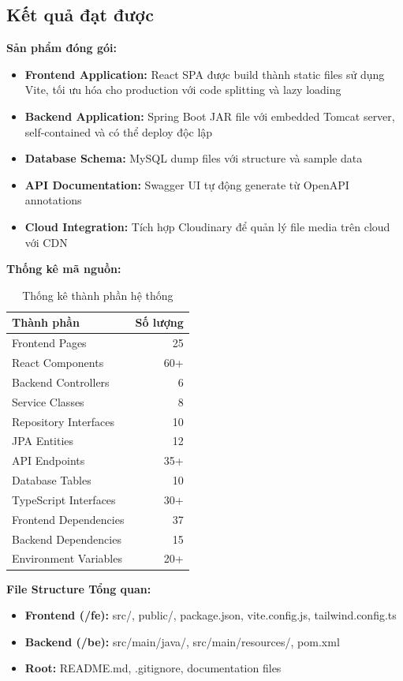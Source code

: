 \documentclass[../DoAn.tex]{subfiles}
\begin{document}
\subsection{Kết quả đạt được}

\textbf{Sản phẩm đóng gói:}
\begin{itemize}
    \item \textbf{Frontend Application:} React SPA được build thành static files sử dụng Vite, tối ưu hóa cho production với code splitting và lazy loading
    \item \textbf{Backend Application:} Spring Boot JAR file với embedded Tomcat server, self-contained và có thể deploy độc lập
    \item \textbf{Database Schema:} MySQL dump files với structure và sample data
    \item \textbf{API Documentation:} Swagger UI tự động generate từ OpenAPI annotations
    \item \textbf{Cloud Integration:} Tích hợp Cloudinary để quản lý file media trên cloud với CDN
\end{itemize}

\textbf{Thống kê mã nguồn:}
\begin{table}[H]
\centering{}
\begin{tabular}{|l|r|}
\hline
\textbf{Thành phần} & \textbf{Số lượng} \\ \hline
Frontend Pages & 25 \\ \hline
React Components & 60+ \\ \hline
Backend Controllers & 6 \\ \hline
Service Classes & 8 \\ \hline
Repository Interfaces & 10 \\ \hline
JPA Entities & 12 \\ \hline
API Endpoints & 35+ \\ \hline
Database Tables & 10 \\ \hline
TypeScript Interfaces & 30+ \\ \hline
Frontend Dependencies & 37 \\ \hline
Backend Dependencies & 15 \\ \hline
Environment Variables & 20+ \\ \hline
\end{tabular}
\caption{Thống kê thành phần hệ thống}
\label{table:system_components}
\end{table}

\textbf{File Structure Tổng quan:}
\begin{itemize}
    \item \textbf{Frontend (/fe):} src/, public/, package.json, vite.config.js, tailwind.config.ts
    \item \textbf{Backend (/be):} src/main/java/, src/main/resources/, pom.xml
    \item \textbf{Root:} README.md, .gitignore, documentation files
\end{itemize}
\end{document}
